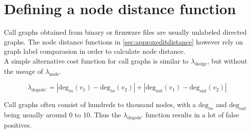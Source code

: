 \documentclass[
    12pt,                               %
    DIV=14,                     %
    parskip=half+,              %
    bigheadings,                %
    cleardoubleempty,   %
    halfparskip,                %
    ]{scrreprt} %
\begin{document}
\section{Defining a node distance function} \label{sec:customattributes}
Call graphs obtained from binary or firmware files are usually unlabeled directed graphs. The node distance functions in \ref{sec:approxeditdistance} however rely on graph label comparasion in order to calculate node distance. \\
A simple alternative cost function for call graphs is similar to $\lambda_{\text{dedge}}$, but without the useage of $\lambda_{\text{node}}$.

\begin{equation}
	\lambda_{\text{degede'}} = |\text{deg}_{in}(v_1) - \text{deg}_{in}(v_2)| + |\text{deg}_{out}(v_1) - \text{deg}_{out}(v_2)|
\end{equation}

Call graphs often consist of hundreds to thousand nodes, with a $\text{deg}_{in}$ and $\text{deg}_{out}$ being usually around 0 to 10. Thus the $\lambda_{\text{degede'}}$ function results in a lot of false positives.
\end{document}

